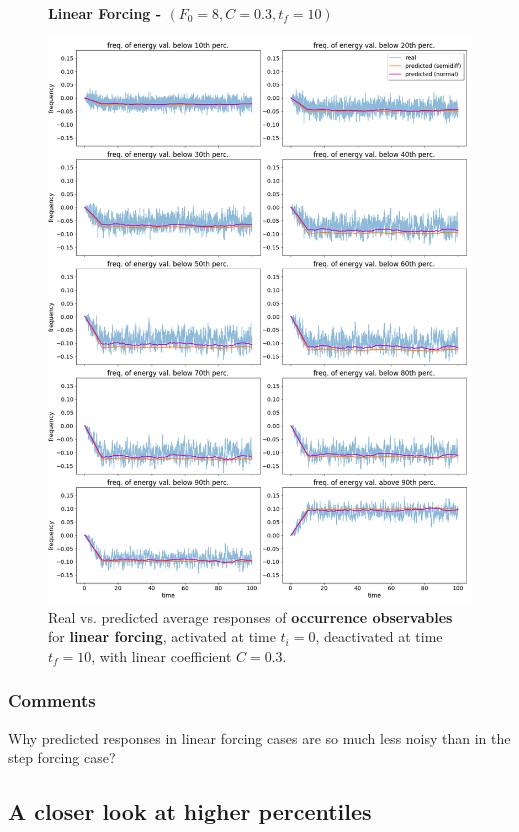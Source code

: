 \documentclass{article}
\begin{document}
\begin{figure}[!h]
	\centering
	\textbf{Linear Forcing - $(F_0=8, C=0.3, t_f=10)$}\par\medskip
	\includegraphics[width=0.9\linewidth]{fig/pred_below_L_03_10.png}
	\caption{Real vs. predicted average responses of \textbf{occurrence observables} for \textbf{linear forcing}, activated at time $t_i=0$, deactivated at time $t_f=10$, with linear coefficient $C=0.3$.}
	\label{fig:pred_bin_L_03_10}
\end{figure}

\subsubsection{Comments}

Why predicted responses in linear forcing cases are so much less noisy than in the step forcing case?

\newpage

\subsection{A closer look at higher percentiles}
\end{document}
